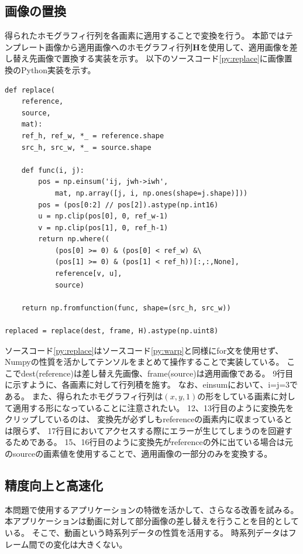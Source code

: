 \subsection{画像の置換}
得られたホモグラフィ行列を各画素に適用することで変換を行う。
本節ではテンプレート画像から適用画像へのホモグラフィ行列$\bm{H}$を使用して、適用画像を差し替え先画像で置換する実装を示す。
以下のソースコード\ref{py:replace}に画像置換のPython実装を示す。
\begin{lstlisting}[caption=画像の置換, label=py:replace]
def replace(
    reference,
    source,
    mat):
    ref_h, ref_w, *_ = reference.shape
    src_h, src_w, *_ = source.shape

    def func(i, j):
        pos = np.einsum('ij, jwh->iwh',
            mat, np.array([j, i, np.ones(shape=j.shape)]))
        pos = (pos[0:2] // pos[2]).astype(np.int16)
        u = np.clip(pos[0], 0, ref_w-1)
        v = np.clip(pos[1], 0, ref_h-1)
        return np.where((
            (pos[0] >= 0) & (pos[0] < ref_w) &\
            (pos[1] >= 0) & (pos[1] < ref_h))[:,:,None],
            reference[v, u],
            source)

    return np.fromfunction(func, shape=(src_h, src_w))

replaced = replace(dest, frame, H).astype(np.uint8)
\end{lstlisting}
ソースコード\ref{py:replace}はソースコード\ref{py:warp}と同様にfor文を使用せず、
Numpyの性質を活かしてテンソルをまとめて操作することで実装している。
ここでdest(reference)は差し替え先画像、frame(source)は適用画像である。
9行目に示すように、各画素に対して行列積を施す。
なお、einsumにおいて、i=j=3である。
また、得られたホモグラフィ行列は$(x,y,1)$の形をしている画素に対して適用する形になっていることに注意されたい。
12、13行目のように変換先をクリップしているのは、
変換先が必ずしもreferenceの画素内に収まっているとは限らず、
17行目においてアクセスする際にエラーが生じてしまうのを回避するためである。
15、16行目のように変換先がreferenceの外に出ている場合は元のsourceの画素値を使用することで、適用画像の一部分のみを変換する。

\subsection{精度向上と高速化}\label{sec:acc_speed}
本問題で使用するアプリケーションの特徴を活かして、さらなる改善を試みる。
本アプリケーションは動画に対して部分画像の差し替えを行うことを目的としている。
そこで、動画という時系列データの性質を活用する。
時系列データはフレーム間での変化は大きくない。


